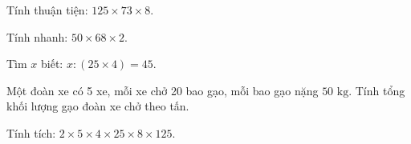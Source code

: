 \begin{ex} %
Tính thuận tiện: $125 \times 73 \times 8$.
\end{ex}

\begin{ex} %
Tính nhanh: $50 \times 68 \times 2$.
\end{ex}

\begin{ex} %
Tìm $x$ biết: $x : (25 \times 4) = 45$.
\end{ex}

\begin{ex} %
Một đoàn xe có 5 xe, mỗi xe chở 20 bao gạo, mỗi bao gạo nặng $50\text{ kg}$. Tính tổng khối lượng gạo đoàn xe chở theo tấn.
\end{ex}

\begin{ex} %
Tính tích: $2 \times 5 \times 4 \times 25 \times 8 \times 125$.
\end{ex}
